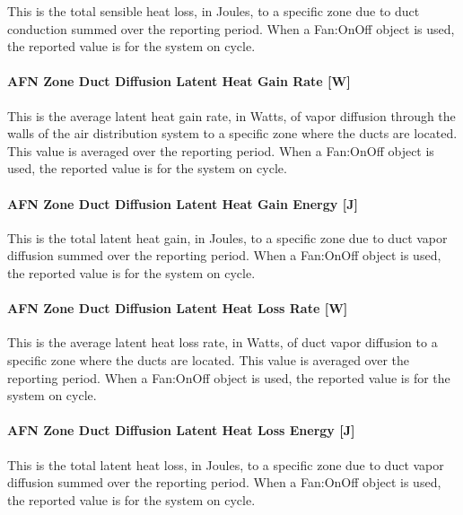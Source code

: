 This is the total sensible heat loss, in Joules, to a specific zone due to duct conduction summed over the reporting period. When a Fan:OnOff object is used, the reported value is for the system on cycle.

\paragraph{AFN Zone Duct Diffusion Latent Heat Gain Rate {[}W{]}}\label{afn-zone-duct-diffusion-latent-heat-gain-rate-w}

This is the average latent heat gain rate, in Watts, of vapor diffusion through the walls of the air distribution system to a specific zone where the ducts are located. This value is averaged over the reporting period. When a Fan:OnOff object is used, the reported value is for the system on cycle.

\paragraph{AFN Zone Duct Diffusion Latent Heat Gain Energy {[}J{]}}\label{afn-zone-duct-diffusion-latent-heat-gain-energy-j}

This is the total latent heat gain, in Joules, to a specific zone due to duct vapor diffusion summed over the reporting period. When a Fan:OnOff object is used, the reported value is for the system on cycle.

\paragraph{AFN Zone Duct Diffusion Latent Heat Loss Rate {[}W{]}}\label{afn-zone-duct-diffusion-latent-heat-loss-rate-w}

This is the average latent heat loss rate, in Watts, of duct vapor diffusion to a specific zone where the ducts are located. This value is averaged over the reporting period. When a Fan:OnOff object is used, the reported value is for the system on cycle.

\paragraph{AFN Zone Duct Diffusion Latent Heat Loss Energy {[}J{]}}\label{afn-zone-duct-diffusion-latent-heat-loss-energy-j}

This is the total latent heat loss, in Joules, to a specific zone due to duct vapor diffusion summed over the reporting period. When a Fan:OnOff object is used, the reported value is for the system on cycle.

